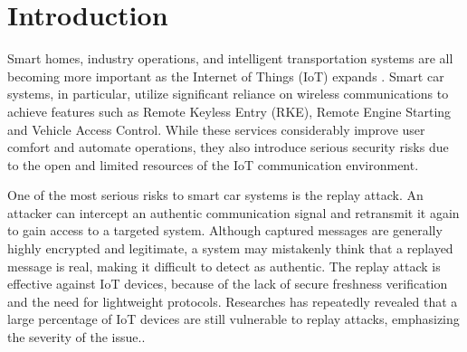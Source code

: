 \documentclass[a4paper,man,12pt]{article}
\begin{document}

\newpage
\tableofcontents
\newpage

\listoffigures
\newpage

\listoftables
\newpage


\setcounter{page}{1} %



\section{Introduction}

Smart homes, industry operations, and intelligent transportation systems are all becoming more important as the Internet of Things (IoT) expands \parencite{new1}. Smart car systems, in particular, utilize significant reliance on wireless communications to achieve features such as Remote Keyless Entry (RKE), Remote Engine Starting and Vehicle Access Control. While these services considerably improve user comfort and automate operations, they also introduce serious security risks due to the open and limited resources of the IoT communication environment. \bigbreak

One of the most serious risks to smart car systems is the replay attack. An attacker can intercept an authentic communication signal and retransmit it again to gain access to a targeted system. Although captured messages are generally highly encrypted and legitimate, a system may mistakenly think that a replayed message is real, making it difficult to detect as authentic. The replay attack is effective against IoT devices, because of the lack of secure freshness verification and the need for lightweight protocols. Researches has repeatedly revealed that a large percentage of IoT devices are still vulnerable to replay attacks, emphasizing the severity of the issue.\parencite{001}. \bigbreak
\end{document}
